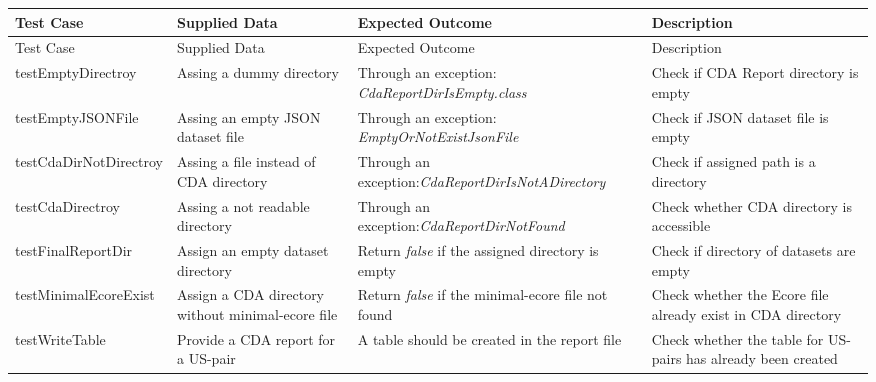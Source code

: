 	\endgroup
	\thispagestyle{empty}
		\begingroup
		\centering
		\scriptsize
		\renewcommand{\arraystretch}{1,5} 
		\keepXColumns
		\begin{tabularx}{\textwidth}{X  X  X  X}
			
			\hline
			Test Case &Supplied Data&Expected Outcome&Description\\
			\hline\hline
			\endfirsthead
			\hline
			Test Case &Supplied Data&Expected Outcome&Description\\
			\hline\hline
			\endhead
			testEmptyDirectroy&Assing a dummy directory&Through an exception: \textit{CdaReportDirIsEmpty.class}&Check if CDA Report directory is empty\\
			
			testEmptyJSONFile&Assing an empty JSON dataset file&Through an exception: \textit{EmptyOrNotExistJsonFile}&Check if JSON dataset file is empty\\
			
			testCdaDirNotDirectroy&Assing a file instead of CDA directory&Through an exception:\textit{CdaReportDirIsNotADirectory}&Check if assigned path is a directory\\
			
			testCdaDirectroy&Assing a not readable directory&Through an exception:\textit{CdaReportDirNotFound}&Check whether CDA directory is accessible\\
			
			testFinalReportDir&Assign an empty dataset directory&Return \textit{false} if the assigned directory is empty&Check if directory of datasets are empty\\
			
			testMinimalEcoreExist&Assign a CDA directory without minimal-ecore file&Return \textit{false} if the minimal-ecore file not found&Check whether the Ecore file already exist in CDA directory\\
			
			testWriteTable&Provide a CDA report for a US-pair&A table should be created in the report file&Check whether the table for US-pairs has already been created\\
			

\end{tabularx}
